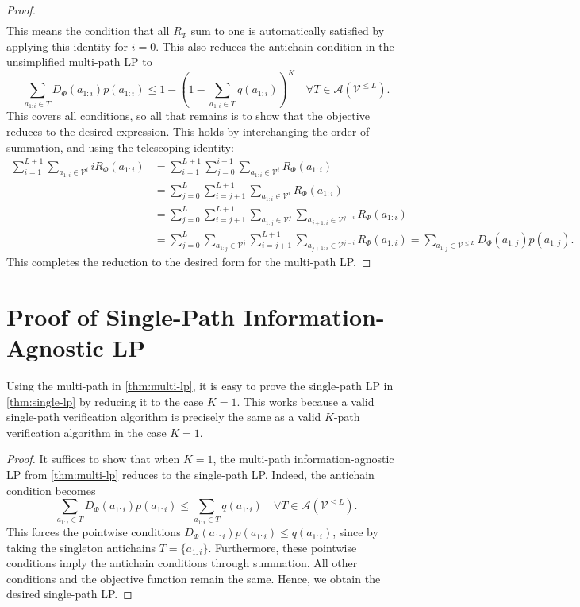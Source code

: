 \documentclass{article}
\theoremstyle{plain}
\theoremstyle{definition}
\theoremstyle{remark}
\newcommand{\V}{\mathcal{V}}
\begin{document}
\begin{proof}
\begin{align}
    \end{align}
    This means the condition that all $R_\Phi$ sum to one is automatically satisfied by applying this identity for $i=0$. This also reduces the antichain condition in the unsimplified multi-path LP to
    \begin{equation}
        \sum_{a_{1:i} \in T} D_\Phi(a_{1:i})p(a_{1:i}) \leq 1 - \left(1 - \sum_{a_{1:i} \in T} q(a_{1:i})\right)^K \quad \forall T \in \mathcal{A}(\V^{\leq L}).
    \end{equation}
    This covers all conditions, so all that remains is to show that the objective reduces to the desired expression. This holds by interchanging the order of summation, and using the telescoping identity:
    \begin{align}
        \sum_{i=1}^{L+1} \sum_{a_{1:i} \in \V^{i}} i R_\Phi(a_{1:i}) &= \sum_{i=1}^{L+1} \sum_{j=0}^{i-1} \sum_{a_{1:i} \in \V^{i}} R_\Phi(a_{1:i}) \\
        &=  \sum_{j=0}^{L} \sum_{i=j+1}^{L+1} \sum_{a_{1:i} \in \V^{i}} R_\Phi(a_{1:i})\\
        &= \sum_{j=0}^{L} \sum_{i=j+1}^{L+1} \sum_{a_{1:j} \in \V^{j}} \sum_{a_{j+1:i} \in \V^{j-i}}R_\Phi(a_{1:i}) \\
        &= \sum_{j=0}^{L} \sum_{a_{1:j} \in \V^{j}} \sum_{i=j+1}^{L+1}  \sum_{a_{j+1:i} \in \V^{j-i}}R_\Phi(a_{1:i})= \sum_{a_{1:j} \in \V^{\leq L}} D_\Phi(a_{1:j})p(a_{1:j}).
    \end{align}
    This completes the reduction to the desired form for the multi-path LP.
\end{proof}


\section{Proof of Single-Path Information-Agnostic LP}
\label{appendix:single-lp}


Using the multi-path in \cref{thm:multi-lp}, it is easy to prove the single-path LP in \cref{thm:single-lp} by reducing it to the case $K=1$. This works because a valid single-path verification algorithm is precisely the same as a valid $K$-path verification algorithm in the case $K=1$. 


\begin{proof}
It suffices to show that when $K=1$, the multi-path information-agnostic LP from \cref{thm:multi-lp} reduces to the single-path LP. Indeed, the antichain condition becomes
\begin{equation}
\sum_{a_{1:i} \in T} D_\Phi(a_{1:i}) p(a_{1:i}) \leq \sum_{a_{1:i} \in T} q(a_{1:i}) \quad \forall T \in \mathcal{A}(\V^{\leq L}).
\end{equation}
This forces the pointwise conditions $D_\Phi(a_{1:i}) p(a_{1:i}) \leq q(a_{1:i})$, since by taking the singleton antichains $T=\{a_{1:i}\}$. Furthermore, these pointwise conditions imply the antichain conditions through summation. All other conditions and the objective function remain the same. Hence, we obtain the desired single-path LP. 
\end{proof}
\end{document}
